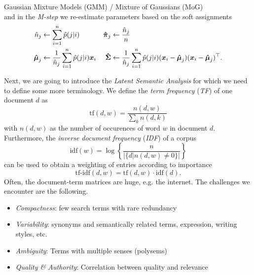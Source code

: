 \begin{topic}{0.3cm}{Gaussian Mixture Models (GMM) / Mixture of Gaussians (MoG)}
\begin{equation}
	\end{equation}
	and in the \emph{M-step} we re-estimate parameters based on the soft assignments %
	\begin{align}
		\hat{n}_j &\leftarrow \sum_{i=1}^n \hat{p}(j|i) & \boldsymbol{\hat{\pi}}_j &\leftarrow \frac{\hat{n}_j}{n} \\
		\boldsymbol{\hat{\mu}}_j &\leftarrow \frac{1}{\hat{n}_j} \sum_{i=1}^n \hat{p}(j|i) \boldsymbol{x}_i & \boldsymbol{\hat{\Sigma}} &\leftarrow \frac{1}{\hat{n}_j} \sum_{i=1}^n \hat{p}(j|i) (\boldsymbol{x}_i - \boldsymbol{\hat{\mu}}_j) (\boldsymbol{x}_i - \boldsymbol{\hat{\mu}}_j)^\top.
	\end{align}
\end{topic}
Next, we are going to introduce the \emph{Latent Semantic Analysis} for which we need to define some more terminology. %
We define the \emph{term frequency} (\emph{TF}) of one document \ensuremath{d} as %
\begin{equation}
	\mathrm{tf}(d,w) = \frac{n(d,w)}{\sum_k n(d,k)}
\end{equation}
with \ensuremath{n(d,w)} as the number of occurences of word \ensuremath{w} in document \ensuremath{d}. %
Furthermore, the \emph{inverse document frequency} (\emph{IDF}) of a corpus %
\begin{equation}
	\mathrm{idf}(w) = \log\left\{ \frac{n}{|\{ d| n(d,w) \neq 0 \}|} \right\}
\end{equation}
can be used to obtain a weighting of entries according to importance %
\begin{equation}
	\mathrm{\text{tf-idf}}(d,w) = \mathrm{tf}(d,w) \cdot \mathrm{idf}(d).
\end{equation}
Often, the document-term matrices are huge, e.g. the internet. %
The challenges we encounter are the following. %
\begin{itemize}
	\item \emph{Compactness}: few search terms with rare redundancy
	\item \emph{Variability}: synonyms and semantically related terms, expression, writing styles, etc.
	\item \emph{Ambiguity}: Terms with multiple senses (polysems)
	\item \emph{Quality \& Authority}: Correlation between quality and relevance
\end{itemize}
